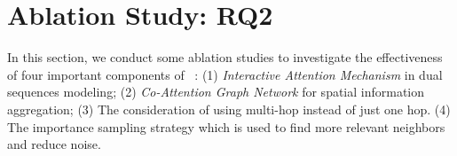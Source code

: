 \begin{table}[h]
	\centering
	\caption{Performance comparison on different size of \textit{user/item-rooted interaction set.}}\label{tab:size-perf-table}
	\tiny
	\vspace{-10pt}
\end{table}


\section{Ablation Study: RQ2} \label{sec:ab-study}
In this section, we conduct some ablation studies to investigate the effectiveness of four important components of \score~: (1) \textit{Interactive Attention Mechanism} in dual sequences modeling; (2) \textit{Co-Attention Graph Network} for spatial information aggregation; (3) The consideration of using multi-hop instead of just one hop. (4) The importance sampling strategy which is used to find more relevant neighbors and reduce noise.



